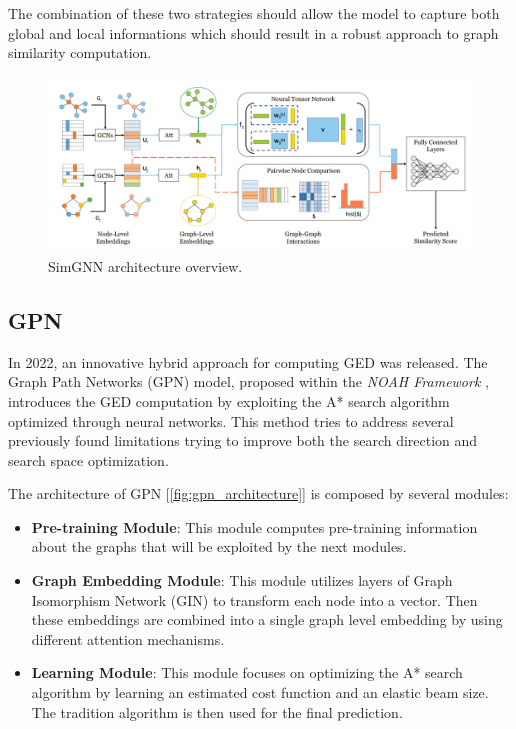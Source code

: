 \documentclass[../Thesis.tex]{subfiles}
\begin{document}
	The combination of these two strategies should allow the model to capture both global and local informations which should result in a robust approach to graph similarity computation.
	
	\begin{figure}[H]
		\centering
		\includegraphics[width=\textwidth]{Images/simgnn_architecture.png}
		\caption{SimGNN architecture overview.}
		\label{fig:simgnn_architecture}
	\end{figure}

	
	\subsection{GPN}
	\label{sec:gpn}
	
	In 2022, an innovative hybrid approach for computing GED was released.
	The Graph Path Networks (GPN) model, proposed within the \textit{NOAH Framework} \cite{noah__neural_optimized_a*_search_algorithm_for_graph_edit_distance_computation}, introduces the GED computation by exploiting the A* search algorithm optimized through neural networks. This method tries to address several previously found limitations trying to improve both the search direction and search space optimization.
	
	The architecture of GPN [\autoref{fig:gpn_architecture}] is composed by several modules:
	
	\begin{itemize}
		\item \textbf{Pre-training Module}: This module computes pre-training information about the graphs that will be exploited by the next modules.
		\item \textbf{Graph Embedding Module}: This module utilizes layers of Graph Isomorphism Network (GIN) to transform each node into a vector. Then these embeddings are combined into a single graph level embedding by using different attention mechanisms.
		\item \textbf{Learning Module}: This module focuses on optimizing the A* search algorithm by learning an estimated cost function and an elastic beam size. The tradition algorithm is then used for the final prediction.
	\end{itemize}
	
\end{document}

